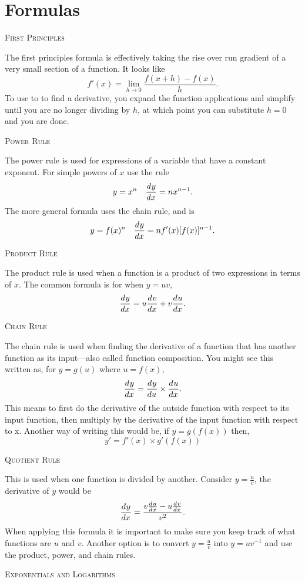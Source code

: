 \documentclass[a4paper,10pt]{article}
\newcommand{\deriv}[3][ ]{\ensuremath\frac{d^{#1}#2}{d#3^{#1}}}
\begin{document}
\section*{Formulas}
\begin{multicols*}{2}
{\large\textsc{First Principles}}

The first principles formula is effectively taking the rise over run 
gradient of a very small section of a function. It looks like
$$f'(x) = \lim_{h\to 0}\frac{f(x + h) - f(x)}{h}.$$
To use to to find a derivative, you expand the function applications 
and simplify until you are no longer dividing by $h$, at which point 
you can substitute $h=0$ and you are done.

{\large\textsc{Power Rule}}

The power rule is used for expressions of a variable that have a constant 
exponent. For simple powers of $x$ use the rule 
$$y = x^n \quad \deriv{y}{x} = nx^{n-1}.$$
The more general formula uses the chain rule, and is
$$y = f(x)^n \quad \deriv{y}{x} = nf'(x)[f(x)]^{n-1}.$$

{\large\textsc{Product Rule}}

The product rule is used when a function is a product of two expressions 
in terms of $x$. The common formula is for when $y = uv$,
$$\deriv{y}{x} = u\deriv{v}{x} + v\deriv{u}{x}.$$

{\large\textsc{Chain Rule}}

The chain rule is used when finding the derivative of a function that 
has another function as its input---also called function composition.
You might see this written as, for $y = g(u)$ where $u = f(x)$, 
$$\deriv{y}{x} = \deriv{y}{u} \times \deriv{u}{x}.$$
This means to first do the derivative of the outside function with 
respect to its input function, then multiply by the derivative of the 
input function with respect to x. Another way of writing this would 
be, if $y = g(f(x))$ then,
$$y' = f'(x) \times g'(f(x))$$

{\large\textsc{Quotient Rule}}

This is used when one function is divided by another. Consider
$y = \frac{u}{v}$, the derivative of $y$ would be 
$$\deriv{y}{x} = \frac{v\deriv{u}{x} - u\deriv{v}{x}}{v^2}.$$
When applying this formula it is important to make sure you 
keep track of what functions are $u$ and $v$. Another option is to 
convert $y = \frac{u}{v}$ into $y = uv^{-1}$ and use the product, 
power, and chain rules.

{\large\textsc{Exponentials and Logarithms}}


\end{multicols*}
\end{document}
